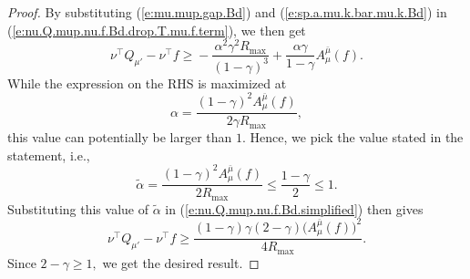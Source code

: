 \documentclass[10pt,a4paper]{amsart}
\newcommand{\mub}{\bar{\mu}}
\newcommand{\mup}{\mu'}
\newcommand{\tr}{\top}
\renewcommand{\eqref}[1]{(\ref{#1})}
\begin{document}
\begin{proof}
    By substituting \eqref{e:mu.mup.gap.Bd} and \eqref{e:sp.a.mu.k.bar.mu.k.Bd} in \eqref{e:nu.Q.mup.nu.f.Bd.drop.T.mu.f.term}, we then get
    \begin{equation}
    \label{e:nu.Q.mup.nu.f.Bd.simplified}
        \nu^\tr Q_{\mup} - \nu^\tr f 
        \geq {} - \frac{ \alpha^2 \gamma^2 R_{\max}}{(1 - \gamma)^3}  + \frac{ \alpha\gamma}{1 - \gamma} A_{\mu}^{\mub} (f).
    \end{equation}
    While the expression on the RHS is maximized at 
    \[
        \alpha = \frac{(1 - \gamma)^2 A_\mu^{\bar{\mu}}(f)}{2 \gamma R_{\max}},
    \]
    this value can potentially be larger than $1.$ Hence, we pick the value stated in the statement, i.e.,
    \[
        \tilde{\alpha} = \frac{(1 - \gamma)^2 A_\mu^{\bar{\mu}}(f)}{2 R_{\max}} \leq \frac{1 - \gamma}{2} \leq 1.
    \]
    Substituting this value of $\tilde{\alpha}$ in \eqref{e:nu.Q.mup.nu.f.Bd.simplified} then gives 
    \[
        \nu^\tr Q_{\mup} - \nu^\tr f 
        \geq {} \frac{(1 - \gamma) \gamma (2 - \gamma) \Big(A_{\mu}^{\mub}(f)\Big)^2}{4 R_{\max}}.
    \]
    Since $2 - \gamma \geq 1,$ we get the desired result. 
\end{proof}
\end{document}
